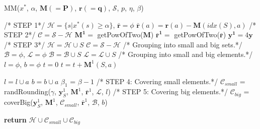 \documentclass[conference]{IEEEtran}
\begin{document}
\begin{algorithm} %
\caption{MM($x^*$, $\alpha$, $\mathbf{M}(=\mathbf{P})$, $\mathbf{r}(=\mathbf{q})$, $\mathscr{S}$, $p$, $\eta$, $\beta$)} %
\label{alg2} %
\begin{algorithmic}[1] %
\STATE
\STATE /* STEP 1*/
\STATE $\mathscr{H} = \{s|x^*(s) \geq \alpha\}$, $\mathbf{\bar{r}} = \phi$
\STATE $\mathbf{\bar{r}}(a) = \mathbf{r}(a) - \mathbf{M}(idx(S),a)$
\ENDFOR
\ENDFOR
\STATE
\STATE /* STEP 2*/
\STATE $\mathscr{C} = \mathscr{S}-\mathscr{H}$
\STATE $\mathbf{M^{1}} =$ getPowOfTwo($\mathbf{M}$)
\STATE $\mathbf{\bar{r}^{1}} =$ getPowOfTwo($\mathbf{\bar{r}}$)
\STATE $\mathbf{y^{1}} = 4\mathbf{y}$
\STATE
\STATE/* STEP 3*/
\STATE $\mathscr{H} = \mathscr{H} \cup S$
\ENDIF
\ENDFOR
\ENDFOR
\STATE $\mathscr{C} = \mathscr{S}-\mathscr{H}$
\STATE
\STATE /* Grouping into small and big sets.*/
\STATE
\STATE $\mathscr{B} = \phi$, $\mathscr{L} = \phi$
\STATE $\mathscr{B} = \mathscr{B} \cup S$
\ELSE
\STATE $\mathscr{L} = \mathscr{L} \cup S$
\ENDIF
\ENDFOR
\ENDFOR
\STATE
\STATE /* Grouping into small and big elements.*/
\STATE
\STATE $l = \phi$, $b = \phi$
\STATE $t=0$
$t = t + \mathbf{M}^{1}(S,a)$
\ENDFOR

\STATE $l = l \cup a$
\ELSE
\STATE $b = b \cup a$
\ENDIF
\ENDFOR
\STATE $\beta_{1}$ = $\beta -1$
\STATE
\STATE /* STEP 4: Covering small elements.*/
\STATE $\mathscr{C}_{small}$ = randRounding($\gamma$, $\mathbf{y}_S^{1}$, $\mathbf{M}^{1}$, $\mathbf{\bar{r}}^{1}$, $\mathscr{L}$, $l$)
\STATE
\STATE /* STEP 5: Covering big elements.*/
\STATE $\mathscr{C}_{big}$ = coverBig($\mathbf{y}_S^{1}$, $\mathbf{M}^{1}$, $\mathscr{C}_{small}$, $\mathbf{\bar{r}}^{1}$, $\mathscr{B}$, $b$)
\STATE

\RETURN \textbf{return} $\mathscr{H}\cup \mathscr{C}_{small}
 \cup \mathscr{C}_{big}$ 
\end{algorithmic}
\end{algorithm}
\end{document}
